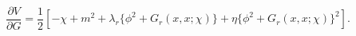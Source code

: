 \begin{equation}
\frac {\partial V}{\partial G} = \frac{1}{2} [ -\chi + m^2  + \lambda_r \{
\phi^2 + G_r(x,x;\chi) \} + \eta  \{
\phi^2 + G_r(x,x;\chi)\}^2] .
\end{equation}

